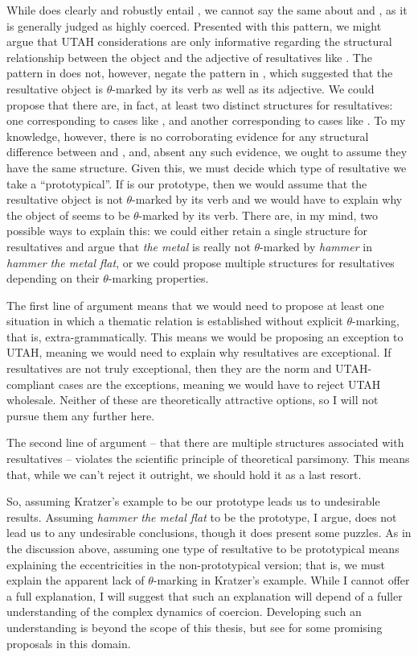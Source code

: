 \documentclass[MilwayThesis]{subfiles}
\begin{document}
While \Last[a] does clearly and robustly entail \Last[c], we cannot say the same about \Last[a] and \Last[b], as it is generally judged as highly coerced.
Presented with this pattern, we might argue that UTAH considerations are only informative regarding the structural relationship between the object and the adjective of resultatives like \Last[a].
The pattern in \Last does not, however, negate the pattern in \LLast, which suggested that the resultative object is $\theta$-marked by its verb as well as its adjective.
We could propose that there are, in fact, at least two distinct structures for resultatives: one corresponding to cases like \LLast, and another corresponding to cases like \Last.
To my knowledge, however, there is no corroborating evidence for any structural difference between \LLast[a] and \Last[a], and, absent any such evidence, we ought to assume they have the same structure.
Given this, we must decide which type of resultative we take a ``prototypical''.
If \Last[a] is our prototype, then we would assume that the resultative object is not $\theta$-marked by its verb and we would have to explain why the object of \LLast[a] seems to be $\theta$-marked by its verb.
There are, in my mind, two possible ways to explain this: we could either retain a single structure for resultatives and argue that \textit{the metal} is really not $\theta$-marked by \textit{hammer} in \textit{hammer the metal flat}, or we could propose multiple structures for resultatives depending on their $\theta$-marking properties.

The first line of argument means that we would need to propose at least one situation in which a thematic relation is established without explicit $\theta$-marking, that is, extra-grammatically.
This means we would be proposing an exception to UTAH, meaning we would need to explain why resultatives are exceptional.
If resultatives are not truly exceptional, then they are the norm and UTAH-compliant cases are the exceptions, meaning we would have to reject UTAH wholesale.
Neither of these are theoretically attractive options, so I will not pursue them any further here.

The second line of argument -- that there are multiple structures associated with resultatives -- violates the scientific principle of theoretical parsimony.
This means that, while we can't reject it outright, we should hold it as a last resort.

So, assuming Kratzer's example to be our prototype leads us to undesirable results.
Assuming \textit{hammer the metal flat} to be the prototype, I argue, does not lead us to any undesirable conclusions, though it does present some puzzles.
As in the discussion above, assuming one type of resultative to be prototypical means explaining the eccentricities in the non-prototypical version;
that is, we must explain the apparent lack of $\theta$-marking in Kratzer's example.
While I cannot offer a full explanation, I will suggest that such an explanation will depend of a fuller understanding of the complex dynamics of coercion.
Developing such an understanding is beyond the scope of this thesis, but see \textcite{pustejovsky1998generative} for some promising proposals in this domain.
\end{document}
